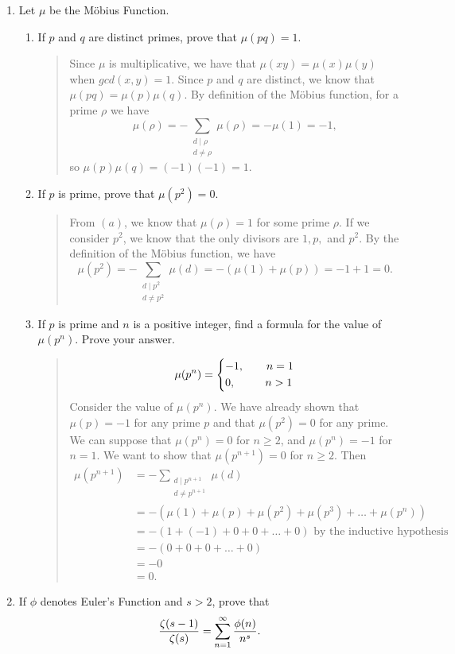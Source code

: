 \documentclass{hw}
\begin{document}
\begin{enumerate}
\newpage
\item Let $\mu$ be the M\"{o}bius Function.
\begin{enumerate}
\item If $p$ and $q$ are distinct primes, prove that $\mu(pq)=1$.
\begin{quote}
Since $\mu$ is multiplicative, we have that $\mu(xy)=\mu(x)\mu(y)$ when $gcd(x,y)=1$. Since $p$ and
$q$ are distinct, we know that $\mu(pq)=\mu(p)\mu(q)$. By definition of the M\"{o}bius function, for
a prime $\rho$ we have
\[
\mu(\rho)=-\sum_{\substack{d\mid \rho\\d\neq\rho}}\mu(\rho)=-\mu(1)=-1,
\]
so $\mu(p)\mu(q)=(-1)(-1)=1$.
\end{quote}
\item If $p$ is prime, prove that $\mu(p^{2})=0$.
\begin{quote}
From $(a)$, we know that $\mu(\rho)=1$ for some prime $\rho$. If we consider $p^2$, we know that the
only divisors are $1,p,$ and $p^2$. By the definition of the M\"{o}bius function, we have
\[
\mu(p^2)=-\sum_{\substack{d\mid p^2\\d\neq p^2}}\mu(d)=-(\mu(1) + \mu(p))=-1 +1 = 0.
\]
\end{quote}
\item If $p$ is prime and $n$ is a positive integer, find a formula for the value of $\mu(p^{n})$.
Prove your answer.
\begin{quote}
\[
\mu(p^n)=
\begin{dcases*}
-1,\qquad n=1\\
0,\ \ \qquad n>1
\end{dcases*}
\]
Consider the value of $\mu(p^{n})$. We have already shown that $\mu(p)=-1$ for any prime $p$ and
that $\mu(p^2)=0$ for any prime. We can suppose that $\mu(p^{n})=0$ for $n\geq2$, and
$\mu(p^{n})=-1$ for $n=1$. We want to show that $\mu(p^{n+1})=0$ for $n\geq2$. Then
\begin{align*}
\mu(p^{n+1})&=-\sum_{\substack{d\mid p^{n+1}\\ d\neq p^{n+1}}}\mu(d)\\
&= -(\mu(1)+\mu(p)+\mu(p^{2})+\mu(p^{3})+\dots+\mu(p^{n}))\\
&= -(1+(-1)+0+0+\dots+0)\text{ by the inductive hypothesis}\\
&= -(0+0+0+\dots+0)\\
&= -0\\
&= 0.
\end{align*}
\end{quote}
\end{enumerate}

\item If $\phi$ denotes Euler's Function and $s>2$, prove that
\[
{\zeta(s-1)\over\zeta(s)}=\sum_{n=1}^{\infty}{\phi(n)\over n^{s}}.
\]
\end{enumerate}
\end{document}
